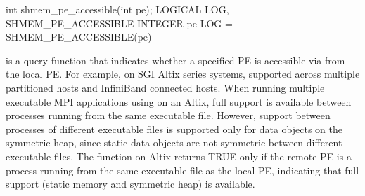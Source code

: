 \synC     
int shmem_pe_accessible(int pe);
\synF
LOGICAL LOG, SHMEM_PE_ACCESSIBLE
INTEGER pe
LOG = SHMEM_PE_ACCESSIBLE(pe)

{
        is  a  query function  that indicates  whether  a
       specified PE is accessible via \openshmem from the local PE. For example, on  SGI	Altix  series  systems, \openshmemis  supported  across multiple
       partitioned hosts and InfiniBand connected hosts. When running multiple executable MPI applications using \openshmem on an Altix,
       full \openshmem support is available between processes running from the same
       executable file. However, \openshmem support between processes of different
       executable  files  is  supported only for data objects on the symmetric
       heap, since static data objects are  not symmetric  between  different
       executable  files. The  function on Altix returns
       TRUE only if  the  remote  \ac{PE}  is  a  process  running  from  the  same
       executable  file	 as  the  local \ac{PE}, indicating that full \openshmem support
       (static memory and symmetric heap) is available.
}
{

\notesB{}
}

\eAPI